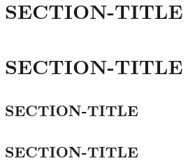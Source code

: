 \section{SECTION-TITLE}
\label{SECTION-LABEL}

\section{SECTION-TITLE}
\label{SECTION-LABEL}

\subsection{SECTION-TITLE}
\label{SECTION-LABEL}

\subsection{SECTION-TITLE}
\label{SECTION-LABEL}